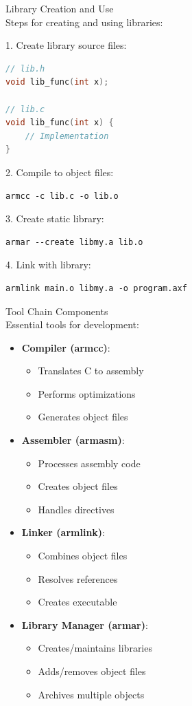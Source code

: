\begin{KR}{Library Creation and Use}\\
Steps for creating and using libraries:

1. Create library source files:
\begin{lstlisting}[language=C, style=basesmol]
// lib.h
void lib_func(int x);

// lib.c
void lib_func(int x) {
    // Implementation
}
\end{lstlisting}

2. Compile to object files:
\begin{lstlisting}[style=basesmol]
armcc -c lib.c -o lib.o
\end{lstlisting}

3. Create static library:
\begin{lstlisting}[style=basesmol]
armar --create libmy.a lib.o
\end{lstlisting}

4. Link with library:
\begin{lstlisting}[style=basesmol]
armlink main.o libmy.a -o program.axf
\end{lstlisting}
\end{KR}

\begin{concept}{Tool Chain Components}\\
Essential tools for development:
\begin{itemize}
  \item \textbf{Compiler (armcc)}:
    \begin{itemize}
      \item Translates C to assembly
      \item Performs optimizations
      \item Generates object files
    \end{itemize}
  \item \textbf{Assembler (armasm)}:
    \begin{itemize}
      \item Processes assembly code
      \item Creates object files
      \item Handles directives
    \end{itemize}
  \item \textbf{Linker (armlink)}:
    \begin{itemize}
      \item Combines object files
      \item Resolves references
      \item Creates executable
    \end{itemize}
  \item \textbf{Library Manager (armar)}:
    \begin{itemize}
      \item Creates/maintains libraries
      \item Adds/removes object files
      \item Archives multiple objects
    \end{itemize}
\end{itemize}
\end{concept}

